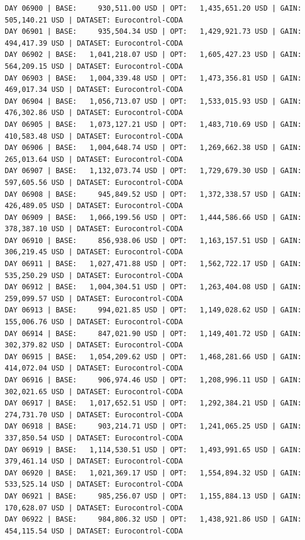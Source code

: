 \documentclass[11pt,a4paper]{article}
\begin{document}
\begin{verbatim}
DAY 06900 | BASE:     930,511.00 USD | OPT:   1,435,651.20 USD | GAIN: 505,140.21 USD | DATASET: Eurocontrol-CODA
DAY 06901 | BASE:     935,504.34 USD | OPT:   1,429,921.73 USD | GAIN: 494,417.39 USD | DATASET: Eurocontrol-CODA
DAY 06902 | BASE:   1,041,218.07 USD | OPT:   1,605,427.23 USD | GAIN: 564,209.15 USD | DATASET: Eurocontrol-CODA
DAY 06903 | BASE:   1,004,339.48 USD | OPT:   1,473,356.81 USD | GAIN: 469,017.34 USD | DATASET: Eurocontrol-CODA
DAY 06904 | BASE:   1,056,713.07 USD | OPT:   1,533,015.93 USD | GAIN: 476,302.86 USD | DATASET: Eurocontrol-CODA
DAY 06905 | BASE:   1,073,127.21 USD | OPT:   1,483,710.69 USD | GAIN: 410,583.48 USD | DATASET: Eurocontrol-CODA
DAY 06906 | BASE:   1,004,648.74 USD | OPT:   1,269,662.38 USD | GAIN: 265,013.64 USD | DATASET: Eurocontrol-CODA
DAY 06907 | BASE:   1,132,073.74 USD | OPT:   1,729,679.30 USD | GAIN: 597,605.56 USD | DATASET: Eurocontrol-CODA
DAY 06908 | BASE:     945,849.52 USD | OPT:   1,372,338.57 USD | GAIN: 426,489.05 USD | DATASET: Eurocontrol-CODA
DAY 06909 | BASE:   1,066,199.56 USD | OPT:   1,444,586.66 USD | GAIN: 378,387.10 USD | DATASET: Eurocontrol-CODA
DAY 06910 | BASE:     856,938.06 USD | OPT:   1,163,157.51 USD | GAIN: 306,219.45 USD | DATASET: Eurocontrol-CODA
DAY 06911 | BASE:   1,027,471.88 USD | OPT:   1,562,722.17 USD | GAIN: 535,250.29 USD | DATASET: Eurocontrol-CODA
DAY 06912 | BASE:   1,004,304.51 USD | OPT:   1,263,404.08 USD | GAIN: 259,099.57 USD | DATASET: Eurocontrol-CODA
DAY 06913 | BASE:     994,021.85 USD | OPT:   1,149,028.62 USD | GAIN: 155,006.76 USD | DATASET: Eurocontrol-CODA
DAY 06914 | BASE:     847,021.90 USD | OPT:   1,149,401.72 USD | GAIN: 302,379.82 USD | DATASET: Eurocontrol-CODA
DAY 06915 | BASE:   1,054,209.62 USD | OPT:   1,468,281.66 USD | GAIN: 414,072.04 USD | DATASET: Eurocontrol-CODA
DAY 06916 | BASE:     906,974.46 USD | OPT:   1,208,996.11 USD | GAIN: 302,021.65 USD | DATASET: Eurocontrol-CODA
DAY 06917 | BASE:   1,017,652.51 USD | OPT:   1,292,384.21 USD | GAIN: 274,731.70 USD | DATASET: Eurocontrol-CODA
DAY 06918 | BASE:     903,214.71 USD | OPT:   1,241,065.25 USD | GAIN: 337,850.54 USD | DATASET: Eurocontrol-CODA
DAY 06919 | BASE:   1,114,530.51 USD | OPT:   1,493,991.65 USD | GAIN: 379,461.14 USD | DATASET: Eurocontrol-CODA
DAY 06920 | BASE:   1,021,369.17 USD | OPT:   1,554,894.32 USD | GAIN: 533,525.14 USD | DATASET: Eurocontrol-CODA
DAY 06921 | BASE:     985,256.07 USD | OPT:   1,155,884.13 USD | GAIN: 170,628.07 USD | DATASET: Eurocontrol-CODA
DAY 06922 | BASE:     984,806.32 USD | OPT:   1,438,921.86 USD | GAIN: 454,115.54 USD | DATASET: Eurocontrol-CODA

\end{verbatim}
\end{document}
